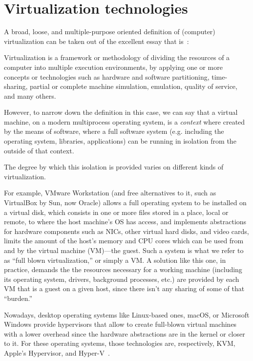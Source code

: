 \section{Virtualization technologies}
\label{sec:leavingvirtualization}

A broad, loose, and multiple-purpose oriented definition of (computer) virtualization can be taken out of the excellent essay that is~\cite{introvirtualization}:
\begin{displayquote}
Virtualization is a framework or methodology of dividing the resources of a computer into multiple execution environments, by applying one or more concepts or technologies such as hardware and software partitioning, time-sharing, partial or complete machine simulation, emulation, quality of service, and many others.
\end{displayquote}

However, to narrow down the definition in this case, we can say that a virtual machine, on a modern multiprocess operating system, is a \emph{context} where created by the means of software, where a full software system (e.g. including the operating system, libraries, applications\textellipsis) can be running in isolation from the outside of that context.

The degree by which this isolation is provided varies on different kinds of virtualization.

For example, VMware Workstation (and free alternatives to it, such as VirtualBox by Sun, now Oracle) allows a full operating system to be installed on a virtual disk, which consists in one or more files stored in a place, local or remote, to where the host machine's OS has access, and implements abstractions for hardware components such as NICs, other virtual hard disks, and video cards, limits the amount of the host's memory and CPU cores which can be used from and by the virtual machine (VM)---the guest. %
Such a system is what we refer to as ``full blown virtualization,'' or simply a VM.
A solution like this one, in practice, demands the the resources necessary for a working machine (including its operating system, drivers, background processes, etc.) are provided by each VM that is a guest on a given host, since there isn't any sharing of some of that ``burden.''

Nowadays, desktop operating systems like Linux-based ones, macOS, or Microsoft Windows provide hypervisors that allow to create full-blown virtual machines with a lower overhead since the hardware abstractions are in the kernel or closer to it.
For these operating systems, those technologies are, respectively, KVM, Apple's Hypervisor, and Hyper-V~\cite{whatiskvm,applehypervisor,hyperv}.

